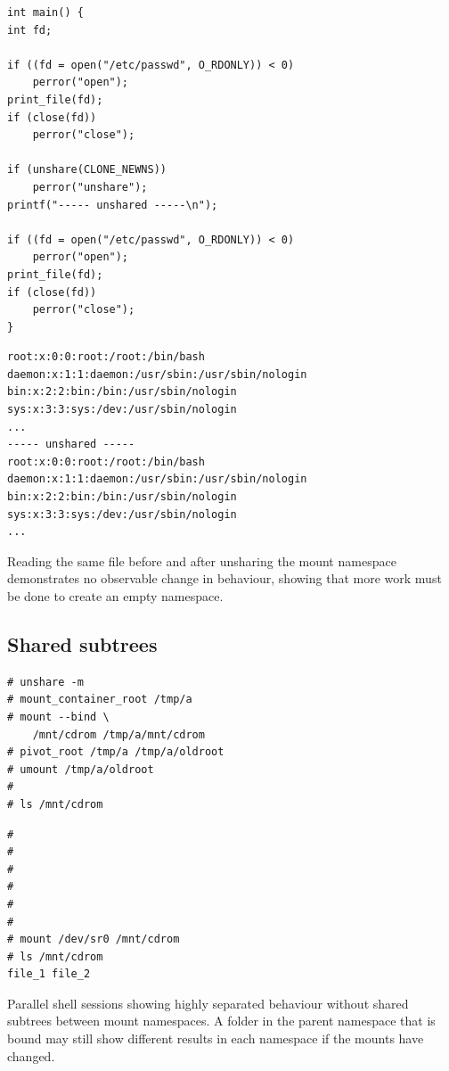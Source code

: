 \documentclass[12pt,a4paper,twoside]{report}
\begin{document}
\begin{listing}
\begin{verbatim}
int main() {
int fd;

if ((fd = open("/etc/passwd", O_RDONLY)) < 0)
    perror("open");
print_file(fd);
if (close(fd))
    perror("close");

if (unshare(CLONE_NEWNS))
    perror("unshare");
printf("----- unshared -----\n");

if ((fd = open("/etc/passwd", O_RDONLY)) < 0)
    perror("open");
print_file(fd);
if (close(fd))
    perror("close");
}
\end{verbatim}
\begin{verbatim}
root:x:0:0:root:/root:/bin/bash
daemon:x:1:1:daemon:/usr/sbin:/usr/sbin/nologin
bin:x:2:2:bin:/bin:/usr/sbin/nologin
sys:x:3:3:sys:/dev:/usr/sbin/nologin
...
----- unshared -----
root:x:0:0:root:/root:/bin/bash
daemon:x:1:1:daemon:/usr/sbin:/usr/sbin/nologin
bin:x:2:2:bin:/bin:/usr/sbin/nologin
sys:x:3:3:sys:/dev:/usr/sbin/nologin
...
\end{verbatim}

\caption{Reading the same file before and after unsharing the mount namespace demonstrates no observable change in behaviour, showing that more work must be done to create an empty namespace.}
\label{lst:unshare-cat-passwd}
\end{listing}

\subsection{Shared subtrees}
\label{sec:voiding-mount-shared-subtrees}

\begin{listing}
\begin{minipage}{.49\textwidth}

\begin{verbatim}
# unshare -m
# mount_container_root /tmp/a
# mount --bind \
    /mnt/cdrom /tmp/a/mnt/cdrom
# pivot_root /tmp/a /tmp/a/oldroot
# umount /tmp/a/oldroot
#
# ls /mnt/cdrom

\end{verbatim}

\end{minipage}\hfill
\begin{minipage}{.49\textwidth}

\begin{verbatim}
#
#
#
#
#
#
# mount /dev/sr0 /mnt/cdrom
# ls /mnt/cdrom
file_1 file_2
\end{verbatim}

\end{minipage}

\caption{Parallel shell sessions showing highly separated behaviour without shared subtrees between mount namespaces. A folder in the parent namespace that is bound may still show different results in each namespace if the mounts have changed.}
\label{lst:shared-subtrees}
\end{listing}
\end{document}
